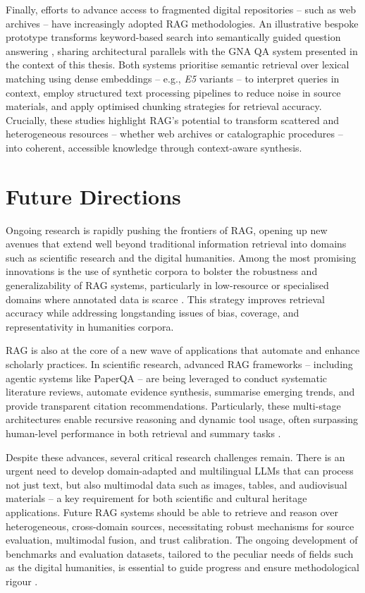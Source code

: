\begin{spacing}{1.5}
Finally, efforts to advance access to fragmented digital repositories -- such as web archives -- have increasingly adopted RAG methodologies. An illustrative bespoke prototype transforms keyword-based search into semantically guided question answering \citep{davis_unlocking_2025}, sharing architectural parallels with the GNA QA system presented in the context of this thesis. Both systems prioritise semantic retrieval over lexical matching using dense embeddings -- e.g., \textit{E5} variants \citep{wang_text_2024} -- to interpret queries in context, employ structured text processing pipelines to reduce noise in source materials, and apply optimised chunking strategies for retrieval accuracy. Crucially, these studies highlight RAG’s potential to transform scattered and heterogeneous resources -- whether web archives or catalographic procedures -- into coherent, accessible knowledge through context-aware synthesis.

\section{Future Directions}
Ongoing research is rapidly pushing the frontiers of RAG, opening up new avenues  that extend well beyond traditional information retrieval into domains such as scientific research and the digital humanities. Among the most promising innovations is the use of synthetic corpora to bolster the robustness and generalizability of RAG systems, particularly in low-resource or specialised domains where annotated data is scarce \citep{bor-woei_generative_2024}. This strategy improves retrieval accuracy while addressing longstanding issues of bias, coverage, and representativity in humanities corpora. 

RAG is also at the core of a new wave of applications that automate and enhance scholarly practices. In scientific research, advanced RAG frameworks -- including agentic systems like PaperQA \citep{lala_paperqa_2023} -- are being leveraged to conduct systematic literature reviews, automate evidence synthesis, summarise emerging trends, and provide transparent citation recommendations. Particularly, these multi-stage architectures enable recursive reasoning and dynamic tool usage, often surpassing human-level performance in both retrieval and summary tasks \citep{skarlinski_language_2024}. 

Despite these advances, several critical research challenges remain. There is an urgent need to develop domain-adapted and multilingual LLMs that can process not just text, but also multimodal data such as images, tables, and audiovisual materials -- a key requirement for both scientific and cultural heritage applications. Future RAG systems should be able to retrieve and reason over heterogeneous, cross-domain sources, necessitating robust mechanisms for source evaluation, multimodal fusion, and trust calibration. The ongoing development of benchmarks and evaluation datasets, tailored to the peculiar needs of fields such as the digital humanities, is essential to guide progress and ensure methodological rigour \citep{yue_survey_2025}.


\end{spacing}
